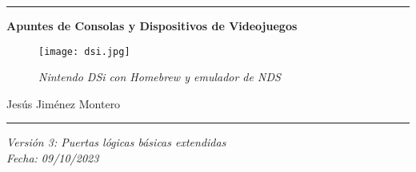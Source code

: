 \documentclass[12pt]{article}
\date{}
\begin{document}
\nocite{atkinson}
\nocite{circuitverse}
\nocite{chatgpt}
\nocite{duke}
\begin{titlepage}
        \begin{center}
             
         
        \hrule
        \vspace{1cm}
        \vspace{1cm}
        {\bfseries\huge Apuntes de Consolas y Dispositivos de Videojuegos \par}
        \vspace{2cm}

        \begin{figure}[H]
            \centering
            \texttt{[image: dsi.jpg]}
            \caption*{\footnotesize{\textit{Nintendo DSi con Homebrew y emulador de NDS}}}
            \label{fig:dsi}
        \end{figure}
        
        {\large 
        Jesús Jiménez Montero \\
        \par}
        \vspace{1cm}
        \hrule
        \vspace{1cm}

        {\large 
        \textit{Versión 3: Puertas lógicas básicas extendidas\\
        Fecha: 09/10/2023}
        \par}
        \end{center}
\end{titlepage}

\newpage
\renewcommand{\contentsname}{Tabla de contenidos}
\setcounter{secnumdepth}{5}
\tableofcontents
\setcounter{tocdepth}{4}

\newpage
\newpage
\renewcommand{\listfigurename}{Lista de figuras}
\thispagestyle{empty}
\listoffigures
\newpage

\renewcommand{\listtablename}{Lista de tablas}
\listoftables
\newpage

\end{document}
